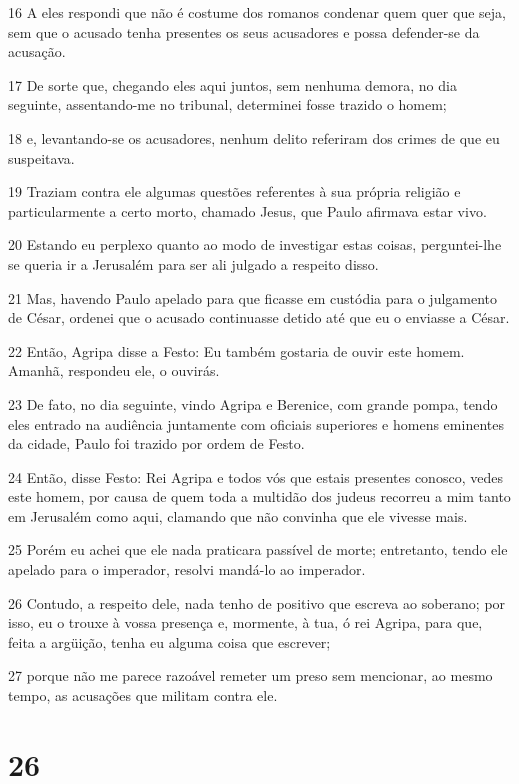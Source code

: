 \par 16 A eles respondi que não é costume dos romanos condenar quem quer que seja, sem que o acusado tenha presentes os seus acusadores e possa defender-se da acusação.
\par 17 De sorte que, chegando eles aqui juntos, sem nenhuma demora, no dia seguinte, assentando-me no tribunal, determinei fosse trazido o homem;
\par 18 e, levantando-se os acusadores, nenhum delito referiram dos crimes de que eu suspeitava.
\par 19 Traziam contra ele algumas questões referentes à sua própria religião e particularmente a certo morto, chamado Jesus, que Paulo afirmava estar vivo.
\par 20 Estando eu perplexo quanto ao modo de investigar estas coisas, perguntei-lhe se queria ir a Jerusalém para ser ali julgado a respeito disso.
\par 21 Mas, havendo Paulo apelado para que ficasse em custódia para o julgamento de César, ordenei que o acusado continuasse detido até que eu o enviasse a César.
\par 22 Então, Agripa disse a Festo: Eu também gostaria de ouvir este homem. Amanhã, respondeu ele, o ouvirás.
\par 23 De fato, no dia seguinte, vindo Agripa e Berenice, com grande pompa, tendo eles entrado na audiência juntamente com oficiais superiores e homens eminentes da cidade, Paulo foi trazido por ordem de Festo.
\par 24 Então, disse Festo: Rei Agripa e todos vós que estais presentes conosco, vedes este homem, por causa de quem toda a multidão dos judeus recorreu a mim tanto em Jerusalém como aqui, clamando que não convinha que ele vivesse mais.
\par 25 Porém eu achei que ele nada praticara passível de morte; entretanto, tendo ele apelado para o imperador, resolvi mandá-lo ao imperador.
\par 26 Contudo, a respeito dele, nada tenho de positivo que escreva ao soberano; por isso, eu o trouxe à vossa presença e, mormente, à tua, ó rei Agripa, para que, feita a argüição, tenha eu alguma coisa que escrever;
\par 27 porque não me parece razoável remeter um preso sem mencionar, ao mesmo tempo, as acusações que militam contra ele.

\chapter{26}

